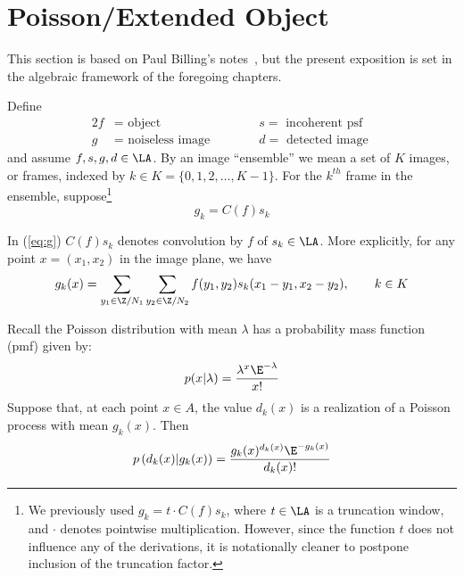    \newcommand\groupA{\ensuremath{A}}
   \newcommand\groupK{\ensuremath{K}}
   \newcommand\groupJ{\ensuremath{J}}
\section{Poisson/Extended Object}\label{sec:poiss-object}
\author{Paul Billings and William DeMeo}
This section is based on Paul Billing's notes~\cite{Billings:2001}, but the
present exposition is set in the algebraic framework of the foregoing chapters.

Define
\begin{alignat*}{2}
f &= \text{ object } \qquad  &&s= \text{ incoherent psf }\\
g &= \text{ noiseless image } \qquad  &&d = \text{ detected image }
\end{alignat*}
and assume $f, s, g, d \in \LA$.
By an image ``ensemble'' we mean a set of $K$ images, or frames,
indexed by 
$k \in \groupK = \{0, 1,2, \ldots,K-1\}$.
For the $k^{th}$ frame in the ensemble, suppose\footnote{We previously used $g_k =t\cdot C(f)s_k$,
where $t\in \LA$ is a truncation window, and $\cdot$ denotes pointwise
multiplication. 
However, since the function $t$ does not
influence any of the derivations, it is notationally cleaner to postpone
inclusion of the truncation factor.}
\begin{equation}\label{eq:g}
g_k = C(f)s_k %
\end{equation}

In (\ref{eq:g}) $C(f)s_k$ denotes convolution by $f$ of $s_k \in
\LA$. 
More explicitly, for any point $x = (x_1,x_2)$ in the image plane, we have
\[
g_k(x) = \sum_{y_1\in \Z/N_1}\sum_{y_2\in \Z/N_2} f(y_1,y_2)s_k(x_1-y_1,x_2-y_2),
\qquad k \in \groupK
\]

Recall the Poisson distribution with mean $\lambda$
has a probability mass function (pmf) given by:
\[
p(x|\lambda) = \frac{\lambda^x \E^{-\lambda}}{x!}
\]
Suppose that, at each point $x\in \groupA$, the value $d_k(x)$ is a
realization of a Poisson process with mean $g_k(x)$.  Then 
\[
p\left(d_k(x)|g_k(x)\right) = \frac{g_k(x)^{d_k(x)} \E^{-g_k(x)}}{d_k(x)!}
\]


